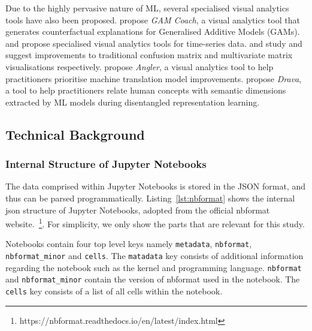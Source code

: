 \documentclass[acmsmall,screen,review,anonymous]{acmart}
\begin{document}
Due to the highly pervasive nature of ML, several specialised visual analytics tools have also been proposed. \citeauthor{wang2023gam} propose \textit{GAM Coach}, a visual analytics tool that generates counterfactual explanations for Generalised Additive Models (GAMs). \citeauthor{bernard2019visual} and \citeauthor{gschwandtner2018know} propose specialised visual analytics tools for time-series data. \citeauthor{gortler2022neo} and \citeauthor{yang2022pattern} study and suggest improvements to traditional confusion matrix and multivariate matrix visualisations respectively. \citeauthor{robertson2023angler} propose \textit{Angler}, a visual analytics tool to help practitioners prioritise machine translation model improvements. \citeauthor{wang2023drava} propose \textit{Drava}, a tool to help practitioners relate human concepts with semantic dimensions extracted by ML models during disentangled representation learning.

\subsection{Technical Background}\label{sec:background}
\subsubsection{Internal Structure of Jupyter Notebooks}\label{sec:nbformat}


\label{lst:nbformat}

The data comprised within Jupyter Notebooks is stored in the JSON format, and thus can be parsed programmatically. Listing~\ref{lst:nbformat} shows the internal json structure of Jupyter Notebooks, adopted from the official nbformat website.~\footnote{https://nbformat.readthedocs.io/en/latest/index.html}. For simplicity, we only show the parts that are relevant for this study.

Notebooks contain four top level keys namely \texttt{metadata}, \texttt{nbformat}, \texttt{nbformat\_minor} and \texttt{cells}. The \texttt{matadata} key consists of additional information regarding the notebook such as the kernel and programming language. \texttt{nbformat} and \texttt{nbformat\_minor} contain the version of nbformat used in the notebook. The \texttt{cells} key consists of a list of all cells within the notebook.
\end{document}
